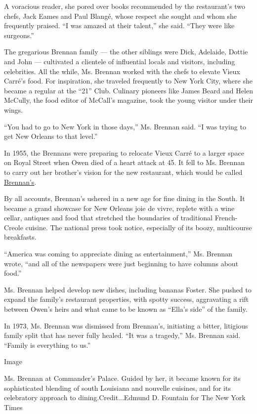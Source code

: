 A voracious reader, she pored over books recommended by the restaurant's
two chefs, Jack Eames and Paul Blangé, whose respect she sought and whom
she frequently praised. ``I was amazed at their talent,'' she said.
``They were like surgeons.''

The gregarious Brennan family --- the other siblings were Dick,
Adelaide, Dottie and John --- cultivated a clientele of influential
locals and visitors, including celebrities. All the while, Ms. Brennan
worked with the chefs to elevate Vieux Carré's food. For inspiration,
she traveled frequently to New York City, where she became a regular at
the ``21'' Club. Culinary pioneers like James Beard and Helen McCully,
the food editor of McCall's magazine, took the young visitor under their
wings.

``You had to go to New York in those days,'' Ms. Brennan said. ``I was
trying to get New Orleans to that level.''

In 1955, the Brennans were preparing to relocate Vieux Carré to a larger
space on Royal Street when Owen died of a heart attack at 45. It fell to
Ms. Brennan to carry out her brother's vision for the new restaurant,
which would be called
\href{https://www.nytimes3xbfgragh.onion/2015/01/21/dining/brennans-in-new-orleans-walks-the-tightrope-of-tradition.html}{Brennan's}.

By all accounts, Brennan's ushered in a new age for fine dining in the
South. It became a grand showcase for New Orleans joie de vivre, replete
with a wine cellar, antiques and food that stretched the boundaries of
traditional French-Creole cuisine. The national press took notice,
especially of its boozy, multicourse breakfasts.

``America was coming to appreciate dining as entertainment,'' Ms.
Brennan wrote, ``and all of the newspapers were just beginning to have
columns about food.''

Ms. Brennan helped develop new dishes, including bananas Foster. She
pushed to expand the family's restaurant properties, with spotty
success, aggravating a rift between Owen's heirs and what came to be
known as ``Ella's side'' of the family.

In 1973, Ms. Brennan was dismissed from Brennan's, initiating a bitter,
litigious family split that has never fully healed. ``It was a
tragedy,'' Ms. Brennan said. ``Family is everything to us.''

Image

Ms. Brennan at Commander's Palace. Guided by her, it became known for
its sophisticated blending of south Louisiana and nouvelle cuisines, and
for its celebratory approach to dining.Credit...Edmund D. Fountain for
The New York Times

